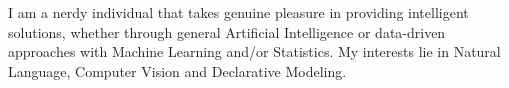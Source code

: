 

\begin{cvparagraph}


\begin{justify}

I am a nerdy individual that takes genuine pleasure in providing intelligent
solutions, whether through general Artificial Intelligence or data-driven
approaches with Machine Learning and/or Statistics. My interests lie in
Natural Language, Computer Vision and Declarative Modeling.


\end{justify}


\end{cvparagraph}
